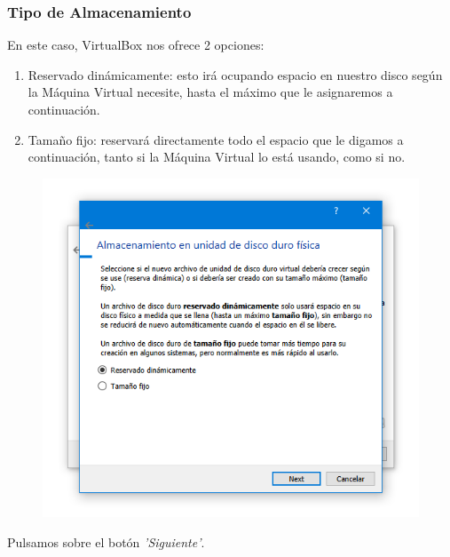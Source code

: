 \subsubsection{Tipo de Almacenamiento}
\noindent
En este caso, VirtualBox nos ofrece 2 opciones:
\begin{enumerate}
    \item Reservado dinámicamente: esto irá ocupando espacio en nuestro disco según la Máquina Virtual necesite, hasta el máximo que le asignaremos a continuación.
    \item Tamaño fijo: reservará directamente todo el espacio que le digamos a continuación, tanto si la Máquina Virtual lo está usando, como si no.
\end{enumerate}
\begin{figure}[H]
        \centering
        \includegraphics[width= 0.7 \textwidth]{Media/VB6.png}
    \end{figure}
\newline \noindent Pulsamos sobre el botón \textit{'Siguiente'}.

